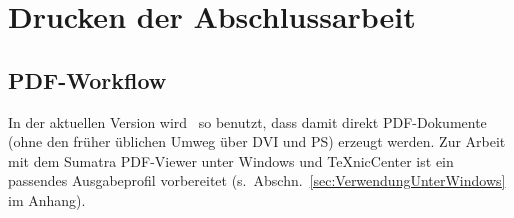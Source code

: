 \chapter{Drucken der Abschlussarbeit}
\label{cha:Drucken}




\section{PDF-Workflow}
\label{sec:pdf}

In der aktuellen Version wird \latex\ so benutzt, dass damit direkt PDF-Dokumente (ohne den früher üblichen Umweg über DVI und PS) erzeugt werden.
Zur Arbeit mit dem Sumatra PDF-Viewer unter Windows und TeXnicCenter ist ein passendes Ausgabeprofil vorbereitet
(s.\ Abschn.\ \ref{sec:VerwendungUnterWindows} im Anhang).%



